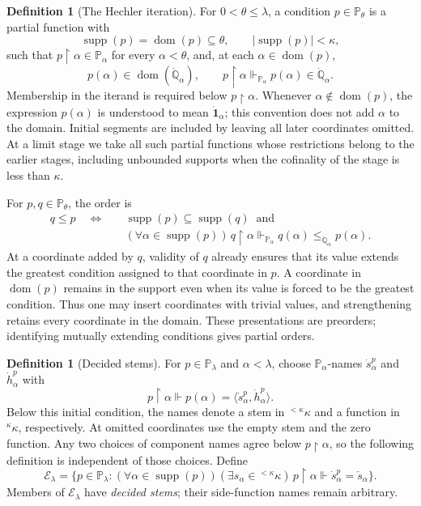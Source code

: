 \documentclass[10pt,a4paper]{amsart}
\theoremstyle{definition}
\newtheorem{definition}[theorem]{Definition}
\theoremstyle{remark}
\newcommand{\PP}{\mathbb P}
\DeclareMathOperator{\dom}{dom}
\DeclareMathOperator{\supp}{supp}
\begin{document}
\begin{definition}[The Hechler iteration]
For \(0<\theta\leq\lambda\), a condition \(p\in\PP_\theta\)
is a partial function with
\[
 \supp(p)=\dom(p)\subseteq\theta,
 \qquad |\supp(p)|<\kappa,
\]
such that \(p\restriction\alpha\in\PP_\alpha\) for every
\(\alpha<\theta\), and, at each \(\alpha\in\dom(p)\),
\[
 p(\alpha)\in\dom(\dot{\mathbb Q}_\alpha),
 \qquad p\restriction\alpha\Vdash_{\PP_\alpha}
                         p(\alpha)\in\dot{\mathbb Q}_\alpha.
\]
Membership in the iterand is required below
\(p\restriction\alpha\).
Whenever \(\alpha\notin\dom(p)\), the expression
\(p(\alpha)\) is understood to mean
\(\dot{\mathbf1}_\alpha\); this convention does not add
\(\alpha\) to the domain. Initial segments are included by
leaving all later coordinates omitted. At a limit stage we
take all such partial functions whose restrictions belong
to the earlier stages, including unbounded supports when
the cofinality of the stage is less than \(\kappa\).

For \(p,q\in\PP_\theta\), the order is
\begin{equation}\label{eq:iteration-order}
 \begin{split}
 q\leq p\quad\Longleftrightarrow\quad&
 \supp(p)\subseteq\supp(q)\ \text{ and}\\
 & (\forall\alpha\in\supp(p))\,
 q\restriction\alpha\Vdash_{\PP_\alpha}
 q(\alpha)\leq_{\dot{\mathbb Q}_\alpha}p(\alpha).
 \end{split}
\end{equation}
At a coordinate added by \(q\), validity of \(q\) already
ensures that its value extends the greatest condition assigned
to that coordinate in \(p\).
A coordinate in \(\dom(p)\) remains in the support even when
its value is forced to be the greatest condition. Thus one may
insert coordinates with trivial values, and strengthening
retains every coordinate in the domain.
These presentations are preorders; identifying mutually extending
conditions gives partial orders.
\end{definition}

\begin{definition}[Decided stems]\label{def:decided-stems}
For \(p\in\PP_\lambda\) and \(\alpha<\lambda\), choose
\(\PP_\alpha\)-names \(\dot s_\alpha^p\) and
\(\dot h_\alpha^p\) with
\[
 p\restriction\alpha\Vdash
 p(\alpha)=\langle\dot s_\alpha^p,\dot h_\alpha^p\rangle.
\]
Below this initial condition, the names denote a stem in
\({}^{<\kappa}\kappa\) and a function in \({}^{\kappa}\kappa\),
respectively. At omitted coordinates use the empty stem and the
zero function. Any two choices of component names agree below
\(p\restriction\alpha\), so the following definition is
independent of those choices.
Define
\[
 \mathcal E_\lambda=
 \{p\in\PP_\lambda:(\forall\alpha\in\supp(p))
   (\exists s_\alpha\in{}^{<\kappa}\kappa)\,
   p\restriction\alpha\Vdash
                   \dot s_\alpha^p=\check s_\alpha\}.
\]
Members of \(\mathcal E_\lambda\) have \emph{decided stems};
their side-function names remain arbitrary.
\end{definition}
\end{document}
